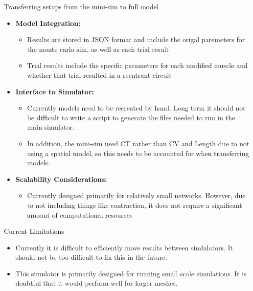 \documentclass[aspectratio=43]{beamer}
\begin{document}
\begin{frame}{Transferring setups from the mini-sim to full model}
    \begin{itemize}
    \item \textbf{Model Integration:}
    \begin{itemize}
        \item Results are stored in JSON format and include the origal 
			paremeters for the monte carlo sim, as well as each trial result
		\item Trial results include the specific parameters for each modified 
			muscle and whether that trial resulted in a reentrant circuit
    \end{itemize}

    \item \textbf{Interface to Simulator:}
    \begin{itemize}
		\item Currently models need to be recreated by hand. Long term it 
			should not be difficult to write a script to generate the files 
			needed to run in the main simulator.
        \item In addition, the mini-sim used CT rather than CV and 
			Length due to not using a spatial model, so this needs to be 
			accounted for when transferring models.
    \end{itemize}

    \item \textbf{Scalability Considerations:}
    \begin{itemize}
        \item Currently designed primarily for relatively small networks. 
			However, due to not including things like contraction, it does not 
			require a significant amount of computational resources
    \end{itemize}
\end{itemize}
\end{frame}
\begin{frame}{Current Limitations}	
	\begin{itemize}
		\item Currently it is difficult to efficiently move results between
			simlulators. It should not be too difficult to fix this in the 
			future.
		\item This simulator is primarily designed for running small scale 
			simulations. It is doubtful that it would perform well for 
			larger meshes. 
	\end{itemize}
\end{frame}
\end{document}
